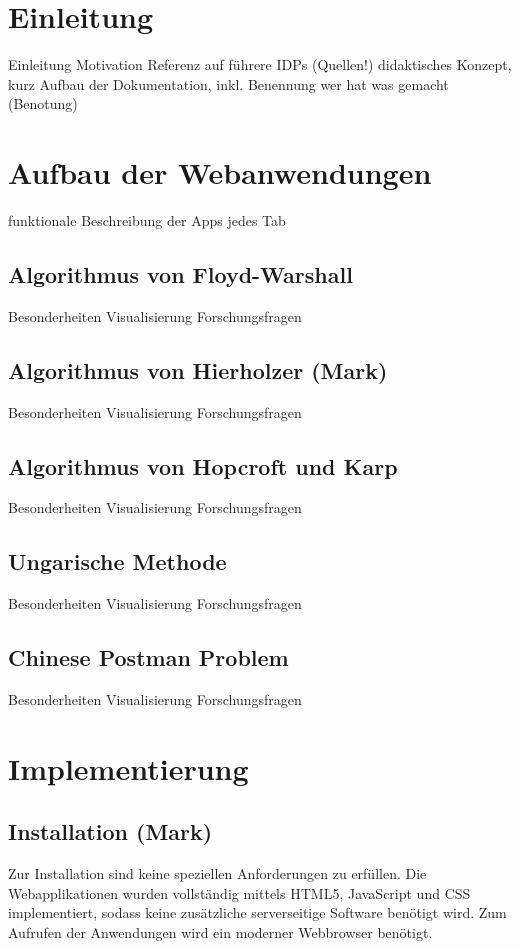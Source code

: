 \chapter{Einleitung}
Einleitung
Motivation
Referenz auf führere IDPs (Quellen!)
didaktisches Konzept, kurz
Aufbau der Dokumentation, inkl. Benennung wer hat was gemacht (Benotung)


\chapter{Aufbau der Webanwendungen}
funktionale Beschreibung der Apps
jedes Tab

\section{Algorithmus von Floyd-Warshall}
Besonderheiten Visualisierung
Forschungsfragen

\section{Algorithmus von Hierholzer (Mark)}
Besonderheiten Visualisierung
Forschungsfragen

\section{Algorithmus von Hopcroft und Karp}
Besonderheiten Visualisierung
Forschungsfragen

\section{Ungarische Methode}
Besonderheiten Visualisierung
Forschungsfragen

\section{Chinese Postman Problem}
Besonderheiten Visualisierung
Forschungsfragen

\chapter{Implementierung}

\section{Installation (Mark)}
Zur Installation sind keine speziellen Anforderungen zu erfüllen. Die Webapplikationen wurden vollständig mittels HTML5, JavaScript und CSS implementiert, sodass keine zusätzliche serverseitige Software benötigt wird. Zum Aufrufen der Anwendungen wird ein moderner Webbrowser benötigt.

